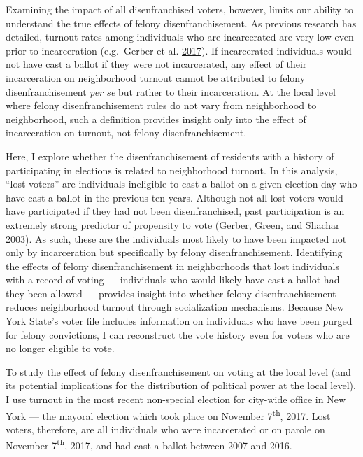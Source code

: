 \documentclass[]{article}
\begin{document}
Examining the impact of all disenfranchised voters, however, limits our ability to understand the true effects of felony disenfranchisement. As previous research has detailed, turnout rates among individuals who are incarcerated are very low even prior to incarceration (e.g.~Gerber et al. \protect\hyperlink{ref-Gerber2017}{2017}). If incarcerated individuals would not have cast a ballot if they were not incarcerated, any effect of their incarceration on neighborhood turnout cannot be attributed to felony disenfranchisement \emph{per se} but rather to their incarceration. At the local level where felony disenfranchisement rules do not vary from neighborhood to neighborhood, such a definition provides insight only into the effect of incarceration on turnout, not felony disenfranchisement.

Here, I explore whether the disenfranchisement of residents with a history of participating in elections is related to neighborhood turnout. In this analysis, ``lost voters'' are individuals ineligible to cast a ballot on a given election day who have cast a ballot in the previous ten years. Although not all lost voters would have participated if they had not been disenfranchised, past participation is an extremely strong predictor of propensity to vote (Gerber, Green, and Shachar \protect\hyperlink{ref-Gerber2003}{2003}). As such, these are the individuals most likely to have been impacted not only by incarceration but specifically by felony disenfranchisement. Identifying the effects of felony disenfranchisement in neighborhoods that lost individuals with a record of voting --- individuals who would likely have cast a ballot had they been allowed --- provides insight into whether felony disenfranchisement reduces neighborhood turnout through socialization mechanisms. Because New York State's voter file includes information on individuals who have been purged for felony convictions, I can reconstruct the vote history even for voters who are no longer eligible to vote.

To study the effect of felony disenfranchisement on voting at the local level (and its potential implications for the distribution of political power at the local level), I use turnout in the most recent non-special election for city-wide office in New York --- the mayoral election which took place on November 7\textsuperscript{th}, 2017. Lost voters, therefore, are all individuals who were incarcerated or on parole on November 7\textsuperscript{th}, 2017, and had cast a ballot between 2007 and 2016.
\end{document}
